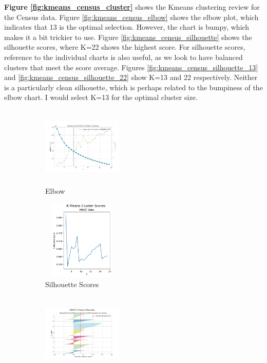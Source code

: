 \documentclass[letterpaper]{article} %
\begin{document}
\textbf{Figure \ref{fig:kmeans_census_cluster}} shows the Kmeans clustering review for the Census data.  Figure \ref{fig:kmeans_census_elbow} shows the elbow plot, which indicates that 13 is the optimal selection.  However, the chart is bumpy, which makes it a bit trickier to use.  Figure \ref{fig:kmeans_census_silhouette} shows the silhouette scores, where K=22 shows the highest score.  For silhouette scores, reference to the individual charts is also useful, as we look to have balanced clusters that meet the score average.  Figures  \ref{fig:kmeans_census_silhouette_13}  and \ref{fig:kmeans_census_silhouette_22} show K=13 and 22 respectively. Neither is a particularly clean silhouette, which is perhaps related to the bumpiness of the elbow chart.  I would select K=13 for the optimal cluster size.

\begin{figure}[!htb]
	\centering
		\begin{subfigure} [b]{.25\textwidth}
			\centering
			\includegraphics[width=1.5in, height=1.5in]{figures/MNIST_elbow_max_25_best_9.png}
			\caption{Elbow}
			\label{fig:kmeans_mnist_elbow}
		\end{subfigure}%
		\begin{subfigure}[b]  {.25\textwidth}
			\includegraphics[width=1.5in, height=1.5in]{figures/K_Means_Cluster_Scores_MNIST_Data.png}
			\caption{Silhouette Scores}
			\label{fig:kmeans_mnist_silhouette}
		\end{subfigure}
		\newline
		\begin{subfigure} [b]{.25\textwidth}
			\centering
			\includegraphics[width=1.5in, height=1.5in]{figures/MNIST_silhouette_K_8.png}

\end{subfigure}
\end{figure}
\end{document}
